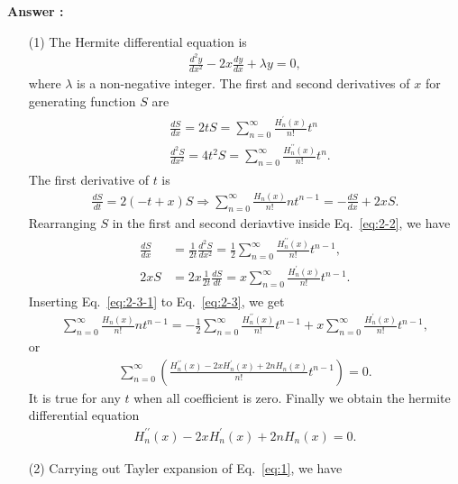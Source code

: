 \documentclass[floatfix,nofootinbib,superscriptaddress,fleqn]{revtex4-2}
\begin{document}
\noindent \textbf{Answer : }
\begin{itemize}
\item[(1)] The Hermite differential equation is
\begin{align}\label{eq:2-1}
  \frac{d^2y}{dx^2}-2x\frac{dy}{dx}+\lambda y = 0,
\end{align}
where $\lambda$ is a non-negative integer. 
The first and second derivatives of $x$ for generating function $S$ are
\begin{align}\label{eq:2-2}
  \begin{split}
    &\frac{dS}{dx} = 2tS = \sum^\infty_{n=0}
    \frac{H^\prime_n(x)}{n!}t^n  \\
    &\frac{d^2S}{dx^2} = 4t^2S=\sum^\infty_{n=0}
    \frac{H^{\prime\prime}_n(x)}{n!}t^n.
  \end{split}
\end{align}
The first derivative of $t$ is
\begin{align}\label{eq:2-3}
  \frac{dS}{dt} = 2(-t+x)S \Longrightarrow \sum^\infty_{n=0}
  \frac{H_n(x)}{n!}nt^{n-1}
  =-\frac{dS}{dx} +2xS.
\end{align}
Rearranging $S$ in the first and second deriavtive inside Eq.~\eqref{eq:2-2}, we have
\begin{align}\label{eq:2-3-1}
  \begin{split}
    \frac{dS}{dx} &= 
    \frac{1}{2t}\frac{d^2S}{dx^2}
    =\frac{1}{2}\sum^\infty_{n=0}
    \frac{H^{\prime\prime}_n(x)}{n!}t^{n-1} , \\
    2xS &= 2x\frac{1}{2t}\frac{dS}{dt} 
    =x\sum^\infty_{n=0}\frac{H^{\prime}_n(x)}{n!}t^{n-1}.
  \end{split}
\end{align}
Inserting Eq.~\eqref{eq:2-3-1} to Eq.~\eqref{eq:2-3}, we get
\begin{align}
  \sum^\infty_{n=0}\frac{H_n(x)}{n!}nt^{n-1}
  =-\frac{1}{2}\sum^\infty_{n=0}\frac{H^{\prime\prime}_n(x)}{n!}t^{n-1}
  +x\sum^\infty_{n=0}\frac{H^{\prime}_n(x)}{n!}t^{n-1},
\end{align}
or
\begin{align}
  \sum^\infty_{n=0}\left(\frac{H^{\prime\prime}_n(x)
  -2xH^{\prime}_n(x)+2nH_n(x)}{n!}t^{n-1}\right)=0.
\end{align}
It is true for any $t$ when all coefficient is zero. Finally we obtain
the hermite differential equation
\begin{align}\label{eq:2-4}
  H^{\prime\prime}_n(x)
  -2xH^{\prime}_n(x)+2nH_n(x)=0.
\end{align}
\item[(2)] Carrying out Tayler expansion of Eq.~\eqref{eq:1}, we have

\end{itemize}
\end{document}
